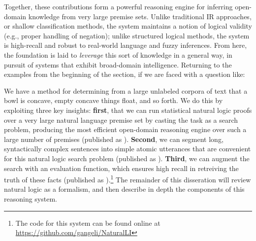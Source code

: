 %
%
Together, these contributions form a powerful reasoning engine for inferring open-domain
  knowledge from very large premise sets.
Unlike traditional IR approaches, or shallow classification methods, the system maintains
  a notion of logical validity (e.g., proper handling of negation);
  unlike structured logical methods, the system is high-recall and robust to
  real-world language and fuzzy inferences.
From here, the foundation is laid to \textit{leverage} this sort of knowledge in a
  general way, in pursuit of systems that exhibit broad-domain intelligence.
Returning to the examples from the beginning of the section, if we are faced with a question like:

\begin{displayquote}
\end{displayquote}

\noindent We have a method for determining from a large unlabeled corpora of text
  that a bowl is concave, empty concave things float, and so forth.
We do this by exploiting three key insights: \textbf{first}, that we can run statistical natural logic proofs
  over a very large natural language premise set by casting the task as a search problem, producing
  the most efficient open-domain reasoning engine over such a large number of premises (published as
  ).
\textbf{Second}, we can segment long, syntactically complex sentences into simple atomic utterances that are
  convenient for this natural logic search problem (published as ).
\textbf{Third}, we can augment the search with an evaluation function, which ensures high recall in retreiving
  the truth of these facts (published as ).\footnote{
  The code for this system can be found online at \url{https://github.com/gangeli/NaturalLI}
  }
The remainder of this disseration will review natural logic as a formalism, and then describe in depth
  the components of this reasoning system.
